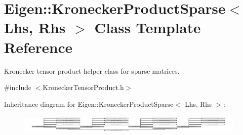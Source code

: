 \hypertarget{class_eigen_1_1_kronecker_product_sparse}{}\section{Eigen\+:\+:Kronecker\+Product\+Sparse$<$ Lhs, Rhs $>$ Class Template Reference}
\label{class_eigen_1_1_kronecker_product_sparse}


Kronecker tensor product helper class for sparse matrices.  




{\ttfamily \#include $<$Kronecker\+Tensor\+Product.\+h$>$}

Inheritance diagram for Eigen\+:\+:Kronecker\+Product\+Sparse$<$ Lhs, Rhs $>$\+:\begin{figure}[H]
\begin{center}
\leavevmode
\includegraphics[height=0.905730cm]{class_eigen_1_1_kronecker_product_sparse}
\end{center}
\end{figure}
